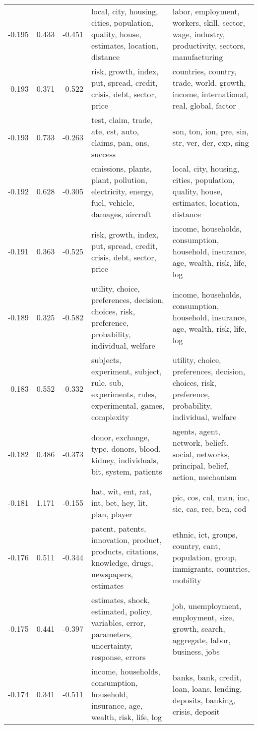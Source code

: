 \begin{tabular}{cccp{5cm}p{5cm}}
-0.195 & 0.433 & -0.451 & local, city, housing, cities, population, quality, house, estimates, location, distance & labor, employment, workers, skill, sector, wage, industry, productivity, sectors, manufacturing \\
-0.193 & 0.371 & -0.522 & risk, growth, index, put, spread, credit, crisis, debt, sector, price & countries, country, trade, world, growth, income, international, real, global, factor \\
-0.193 & 0.733 & -0.263 & test, claim, trade, ate, cst, auto, claims, pan, ons, success & son, ton, ion, pre, sin, str, ver, der, exp, sing \\
-0.192 & 0.628 & -0.305 & emissions, plants, plant, pollution, electricity, energy, fuel, vehicle, damages, aircraft & local, city, housing, cities, population, quality, house, estimates, location, distance \\
-0.191 & 0.363 & -0.525 & risk, growth, index, put, spread, credit, crisis, debt, sector, price & income, households, consumption, household, insurance, age, wealth, risk, life, log \\
-0.189 & 0.325 & -0.582 & utility, choice, preferences, decision, choices, risk, preference, probability, individual, welfare & income, households, consumption, household, insurance, age, wealth, risk, life, log \\
-0.183 & 0.552 & -0.332 & subjects, experiment, subject, rule, sub, experiments, rules, experimental, games, complexity & utility, choice, preferences, decision, choices, risk, preference, probability, individual, welfare \\
-0.182 & 0.486 & -0.373 & donor, exchange, type, donors, blood, kidney, individuals, bit, system, patients & agents, agent, network, beliefs, social, networks, principal, belief, action, mechanism \\
-0.181 & 1.171 & -0.155 & hat, wit, ent, rat, int, bet, hey, lit, plan, player & pic, cos, cal, man, inc, sic, cas, rec, ben, cod \\
-0.176 & 0.511 & -0.344 & patent, patents, innovation, product, products, citations, knowledge, drugs, newspapers, estimates & ethnic, ict, groups, country, cant, population, group, immigrants, countries, mobility \\
-0.175 & 0.441 & -0.397 & estimates, shock, estimated, policy, variables, error, parameters, uncertainty, response, errors & job, unemployment, employment, size, growth, search, aggregate, labor, business, jobs \\
-0.174 & 0.341 & -0.511 & income, households, consumption, household, insurance, age, wealth, risk, life, log & banks, bank, credit, loan, loans, lending, deposits, banking, crisis, deposit \\
\bottomrule
\end{tabular}
